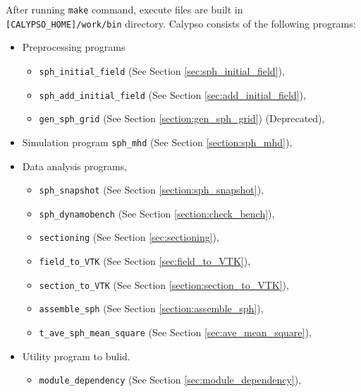 After running \verb|make| command, execute files are built in \verb|[CALYPSO_HOME]/work/bin| directory. Calypso consists of the following programs:
%
\begin{itemize}
\item Preprocessing programs
	\begin{itemize}
	\item {\tt sph\_initial\_field} (See Section \ref{sec:sph_initial_field}),
	\item {\tt sph\_add\_initial\_field} (See Section \ref{sec:add_initial_field}),
	\item {\tt gen\_sph\_grid} (See Section \ref{section:gen_sph_grid}) {\color{red} (Deprecated)},
 	\end{itemize}
\item Simulation program {\tt sph\_mhd} (See Section \ref{section:sph_mhd}), 
\item Data analysis programs,
	\begin{itemize}
	\item {\tt sph\_snapshot} (See Section \ref{section:sph_snapshot}),
	\item {\tt sph\_dynamobench} (See Section \ref{section:check_bench}),
	\item {\tt sectioning} (See Section \ref{sec:sectioning}),
 	\item {\tt field\_to\_VTK} (See Section \ref{sec:field_to_VTK}),
 	\item {\tt section\_to\_VTK} (See Section \ref{section:section_to_VTK}),
 	\item {\tt assemble\_sph} (See Section \ref{section:assemble_sph}),
 	\item {\tt t\_ave\_sph\_mean\_square} (See Section \ref{sec:ave_mean_square}),
	\end{itemize}
\item Utility program to bulid.
	\begin{itemize}
	\item {\tt module\_dependency} (See Section \ref{sec:module_dependency}),
	\end{itemize}
\end{itemize}
%

